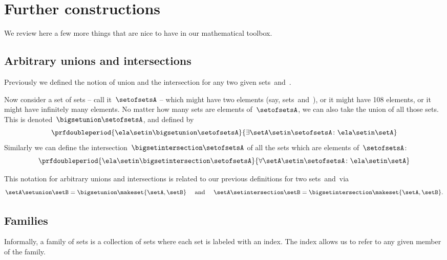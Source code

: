 
\section{Further constructions}
\label{sec:more-constructions}

We review here a few more things that are nice to have in our mathematical toolbox.

\subsection{Arbitrary unions and intersections}

Previously we defined the notion of union and the intersection for any two given sets~\setA and~\setB.

Now consider a set of sets -- call it~$\setofsetsA$ -- which might have two elements (say, sets~\setA and~\setB), or it might have 108 elements, or it might have infinitely many elements.
No matter how many sets are elements of~$\setofsetsA$, we can also take the union of all those sets.
This is denoted~$\bigsetunion \setofsetsA$, and defined by
%
\begin{equation}
    \prfdoubleperiod{ \ela \setin\bigsetunion \setofsetsA }{\exists \setA \setin\setofsetsA \colon \ela \setin\setA}
\end{equation}
%
Similarly we can define the intersection~$\bigsetintersection \setofsetsA$ of all the sets which are elements of~$\setofsetsA$:
%
\begin{equation}
    \prfdoubleperiod{\ela \setin\bigsetintersection \setofsetsA}{\forall \setA \setin\setofsetsA \colon \ela \setin\setA}
\end{equation}

This notation for arbitrary unions and intersections is related to our previous definitions for two sets~\setA and~\setB via
\begin{equation}
    \setA \setunion \setB = \bigsetunion \makeset{ \setA, \setB } \quad \text{ and } \quad \setA \setintersection \setB = \bigsetintersection \makeset{ \setA, \setB }.
\end{equation}

\subsection{Families}

Informally, a family of sets is a collection of sets where each set is labeled with an index.
The index allows us to refer to any given member of the family.

